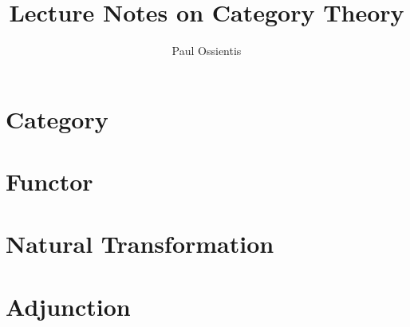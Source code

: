 \documentclass{report}
\title{Lecture Notes on Category Theory}
\author{Paul Ossientis}
\begin{document}
\maketitle
\tableofcontents
\newpage
\chapter{Category}
    
\chapter{Functor}
    
\chapter{Natural Transformation}
    
\chapter{Adjunction}
    
\printindex

\end{document}
